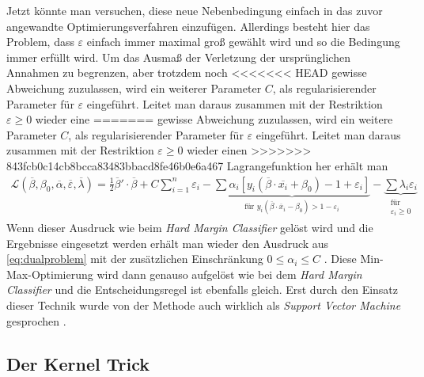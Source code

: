 \documentclass[
]{article}
\begin{document}
Jetzt könnte man versuchen, diese neue Nebenbedingung einfach in das
zuvor angewandte Optimierungsverfahren einzufügen. Allerdings besteht
hier das Problem, dass \(\varepsilon\) einfach immer maximal groß
gewählt wird und so die Bedingung immer erfüllt wird. Um das Ausmaß der
Verletzung der ursprünglichen Annahmen zu begrenzen, aber trotzdem noch
<<<<<<< HEAD
gewisse Abweichung zuzulassen, wird ein weiterer Parameter \(C\), als
regularisierender Parameter für \(\varepsilon\) eingeführt. Leitet man
daraus zusammen mit der Restriktion \(\varepsilon\ge0\) wieder eine
=======
gewisse Abweichung zuzulassen, wird ein weitere Parameter \(C\), als
regularisierender Parameter für \(\varepsilon\) eingeführt. Leitet man
daraus zusammen mit der Restriktion \(\varepsilon\ge0\) wieder einen
>>>>>>> 843fcb0c14cb8bcca83483bbacd8fe46b0e6a467
Lagrangefunktion her erhält man \begin{align}
\mathcal{L}(\overline\beta,\beta_0,\overline\alpha,\overline\varepsilon,\overline\lambda)=\frac{1}{2}\overline\beta'\cdot \overline\beta + C \sum_{i=1}^{n}\varepsilon_i-\underbrace{\sum \alpha_i[y_i(\overline\beta \cdot \overline{x_i}+\beta_0)-1+\varepsilon_i]}_{\text{für }y_i(\overline\beta \cdot \overline{x}_i-\beta_0)>1- \varepsilon_i}-\underbrace{\sum \lambda_i \varepsilon_i }_{\substack{\text{für}\\ \varepsilon_i \ge 0}}
\end{align} Wenn dieser Ausdruck wie beim
\textit{Hard Margin Classifier} gelöst wird und die Ergebnisse
eingesetzt werden erhält man wieder den Ausdruck aus
\eqref{eq:dualproblem} mit der zusätzlichen Einschränkung
\(0\le \alpha_i \le C\) \parencite{bennettSupportVectorMachines2000}.
Diese Min-Max-Optimierung wird dann genauso aufgelöst wie bei dem
\textit{Hard Margin Classifier} und die Entscheidungsregel ist ebenfalls
gleich. Erst durch den Einsatz dieser Technik wurde von der Methode auch
wirklich als \textit{Support Vector Machine} gesprochen
\parencite{vapnikEstimationDependencesBased2006}.

\subsection{Der Kernel Trick}
\end{document}
